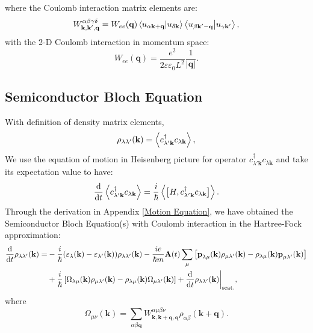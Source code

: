 \documentclass[12pt,english,a4paper]{article}
\newcommand{\dg}{\dagger}
\begin{document}
	\quad where the Coulomb interaction matrix elements are:
	\begin{equation}
		W^{\alpha \beta \gamma \delta}_{\textbf{k}, \textbf{k}',\textbf{q}} = W_{ee}(\textbf{q}) \braket{u_{\alpha\textbf{k} +\textbf{q}}}{u_{\delta\textbf{k}}} \braket{u_{\beta\textbf{k}' -\textbf{q}}}{u_{\gamma \textbf{k}'}},
	\end{equation}
	\quad with the 2-D Coulomb interaction in momentum space:
	\begin{equation}
		\label{2D coulomb}
		W_{ee}(\textbf{q}) = \frac{e^2}{2\varepsilon\varepsilon_0 L^2} \frac{1}{|\textbf{q}|}.
	\end{equation}
	\subsection{Semiconductor Bloch Equation}
	\quad With definition of density matrix elements,
	\begin{equation}
		\rho_{\lambda \lambda'}(\textbf{k}) = \ev{c^\dg_{\lambda'\textbf{k}} c_{\lambda\textbf{k}}},
	\end{equation}
	\quad We use the equation of motion in Heisenberg picture for operator $c^\dg_{\lambda'\textbf{k}} c_{\lambda\textbf{k}}$ and take its expectation value to have:
	\begin{equation}
		\label{Heisenberg eq}
		\dv{}{t}\ev{c^\dg_{\lambda'\textbf{k}} c_{\lambda\textbf{k}}} = \frac{i}{\hbar}\ev{\big[H,c^\dg_{\lambda'\textbf{k}} c_{\lambda\textbf{k}} \big]}.
	\end{equation}
\quad Through the derivation in Appendix \ref{Motion Equation}, we have obtained the Semiconductor Bloch Equation(s) with Coulomb interaction in the Hartree-Fock approximation:
\begin{align}
	\label{SBE HF}
\dv{ }{t}\rho_{\lambda\lambda'}(\textbf{k}) =& - \frac{i}{\hbar} (\varepsilon_\lambda(\textbf{k}) - \varepsilon_{\lambda'} (\textbf{k}))\rho_{\lambda \lambda'}(\textbf{k}) - \frac{ie}{\hbar m} \textbf{A}(t)\sum_{\mu}\left[\textbf{p}_{\lambda\mu}(\textbf{k})\rho_{\mu \lambda'}(\textbf{k}) - \rho_{\lambda\mu}(\textbf{k})\textbf{p}_{\mu \lambda'}(\textbf{k})\right] \nonumber \\
&+ \frac{i}{\hbar}\left[\Omega_{\lambda \mu}(\textbf{k})\rho_{\mu \lambda'}(\textbf{k}) - \rho_{\lambda\mu}(\textbf{k}) \Omega_{\mu \lambda'} (\textbf{k})\right] +\dv{ }{t}\rho_{\lambda\lambda'}(\textbf{k})\bigg|_{\mathrm{scat.}},
\end{align}
\quad where
\begin{equation}
\Omega_{\mu\nu} (\textbf{k})=\sum_{\alpha \beta \textbf{q}} W^{\alpha \mu \beta \nu}_{\textbf{k},\textbf{k}+\textbf{q},\textbf{q}} \rho_{\alpha\beta} (\textbf{k}+\textbf{q}).
\end{equation}
\end{document}
